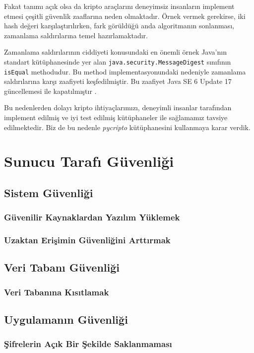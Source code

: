 \documentclass[11pt]{report}
\begin{document}
Fakat tanımı açık olsa da kripto araçlarını deneyimsiz insanların implement etmesi çeşitli güvenlik zaaflarına neden olmaktadır. Örnek vermek gerekirse, iki hash değeri karşılaştırılırken, fark görüldüğü anda algoritmanın sonlanması, zamanlama saldırılarına temel hazırlamaktadır.

Zamanlama saldırılarının ciddiyeti konusundaki en önemli örnek Java'nın standart kütüphanesinde yer alan \texttt{java.security.MessageDigest} sınıfının \texttt{isEqual} methodudur. Bu method implementasyonundaki nedeniyle zamanlama saldırılarına karşı zaafiyeti keşfedilmiştir. Bu zaafiyet Java SE 6 Update 17 güncellemesi ile kapatılmıştır \cite{javavul}.

Bu nedenlerden dolayı kripto ihtiyaçlarımızı, deneyimli insanlar tarafından implement edilmiş ve iyi test edilmiş kütüphaneler ile sağlamamız tavsiye edilmektedir. Biz de bu nedenle \emph{pycripto} kütüphanesini kullanmaya karar verdik.

\chapter{Sunucu Tarafı Güvenliği}
\section{Sistem Güvenliği}
\subsection{Güvenilir Kaynaklardan Yazılım Yüklemek}
\subsection{Uzaktan Erişimin Güvenliğini Arttırmak}
\section{Veri Tabanı Güvenliği}
\subsection{Veri Tabanına Kısıtlamak}
\section{Uygulamanın Güvenliği}
\subsection{Şifrelerin Açık Bir Şekilde Saklanmaması}
\end{document}

